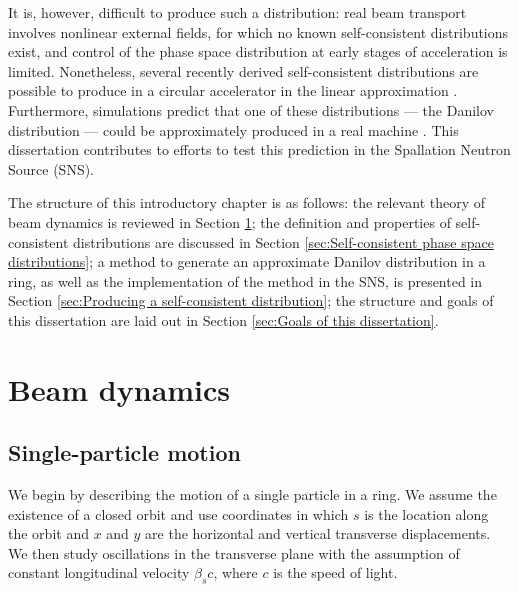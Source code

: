 It is, however, difficult to produce such a distribution: real beam transport involves nonlinear external fields, for which no known self-consistent distributions exist, and control of the phase space distribution at early stages of acceleration is limited. Nonetheless, several recently derived self-consistent distributions are possible to produce in a circular accelerator in the linear approximation \cite{Danilov2003}. Furthermore, simulations predict that one of these distributions — the Danilov distribution — could be approximately produced in a real machine \cite{Holmes2018}. This dissertation contributes to efforts to test this prediction in the Spallation Neutron Source (SNS).

The structure of this introductory chapter is as follows: the relevant theory of beam dynamics is reviewed in Section \ref{sec:High-intensity beam dynamics}; the definition and properties of self-consistent distributions are discussed in Section \ref{sec:Self-consistent phase space distributions}; a method to generate an approximate Danilov distribution in a ring, as well as the implementation of the method in the SNS, is presented in Section \ref{sec:Producing a self-consistent distribution}; the structure and goals of this dissertation are laid out in Section \ref{sec:Goals of this dissertation}.



\section{Beam dynamics}\label{sec:High-intensity beam dynamics}

\subsection{Single-particle motion}

We begin by describing the motion of a single particle in a ring. We assume the existence of a closed orbit and use coordinates in which $s$ is the location along the orbit and $x$ and $y$ are the horizontal and vertical transverse displacements. We then study oscillations in the transverse plane with the assumption of constant longitudinal velocity $\beta_s c$, where $c$ is the speed of light.
 
